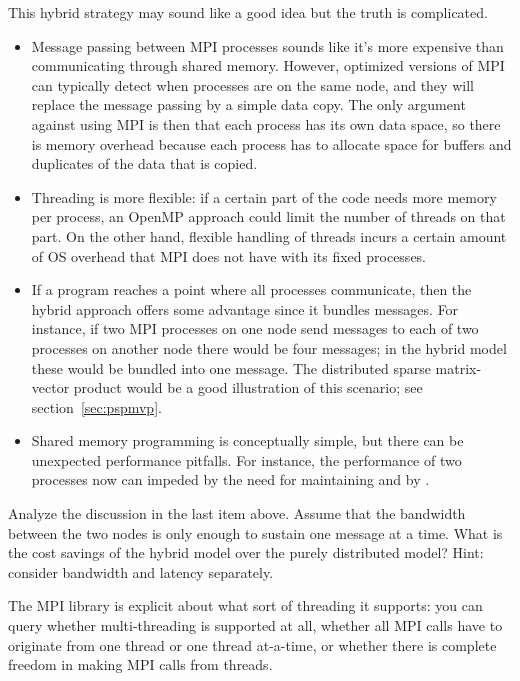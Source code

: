 This hybrid strategy may sound like a good idea but the truth is complicated.
\begin{itemize}
\item Message passing between MPI processes sounds like it's more
  expensive than communicating through shared memory. However,
  optimized versions of MPI can typically detect when processes are on
  the same node, and they will replace the message passing by a simple
  data copy. The only argument against using MPI is then that each
  process has its own data space, so there is memory overhead because
  each process has to allocate space for buffers and duplicates of the
  data that is copied.
\item Threading is more flexible: if a certain part of the code needs
  more memory per process, an OpenMP approach could limit the number
  of threads on that part. On the other hand, flexible handling of
  threads incurs a certain amount of \ac{OS} overhead that MPI does
  not have with its fixed processes.
\item If a program reaches a point where all processes communicate,
  then the hybrid approach offers some advantage since it bundles
  messages. For instance, if two MPI processes on one node send
  messages to each of two processes on another node there would be
  four messages; in the hybrid model these would be bundled into one
  message. The distributed sparse
  matrix-vector product would be a good illustration of this scenario;
  see section~\ref{sec:pspmvp}.
\item Shared memory programming is conceptually simple, but there can
  be unexpected performance pitfalls. For instance, the performance of
  two processes now
  can impeded by the need for maintaining
   and by .
\end{itemize}

\begin{exercise}
  Analyze the discussion in the last item above. Assume that the
  bandwidth between the two nodes is only enough to sustain one
  message at a time. What is the cost savings of the hybrid model over
  the purely distributed model? Hint: consider bandwidth and latency
  separately.
\end{exercise}

The MPI library is explicit about what sort of threading it supports:
you can query whether multi-threading is supported at all, whether all MPI 
calls have to originate from one thread or one thread at-a-time, or whether 
there is complete freedom in making MPI calls from threads.
